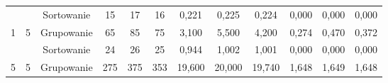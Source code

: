 \documentclass[magisterska]{pracamgr}
\begin{document}
\begin{table}[H]
{\begin{tabular}{@{}cccccccccccc@{}}
                                                                &                                                         & Sortowanie & 15                                                      & 17                                                      & 16                                                         & 0,221                                                      & 0,225                                                      & 0,224                                                          & 0,000                                                              & 0,000                                                               & 0,000                                                                  \\
1                                                               & 5                                                       & Grupowanie & 65                                                      & 85                                                      & 75                                                         & 3,100                                                      & 5,500                                                      & 4,200                                                          & 0,274                                                              & 0,470                                                               & 0,372                                                                  \\ \midrule
                                                                &                                                         & Sortowanie & 24                                                      & 26                                                      & 25                                                         & 0,944                                                      & 1,002                                                      & 1,001                                                          & 0,000                                                              & 0,000                                                               & 0,000                                                                  \\
5                                                               & 5                                                       & Grupowanie & 275                                                     & 375                                                     & 353                                                        & 19,600                                                     & 20,000                                                     & 19,740                                                         & 1,648                                                              & 1,649                                                               & 1,648                                                                  \\ \midrule

\end{tabular}}
\end{table}
\end{document}
